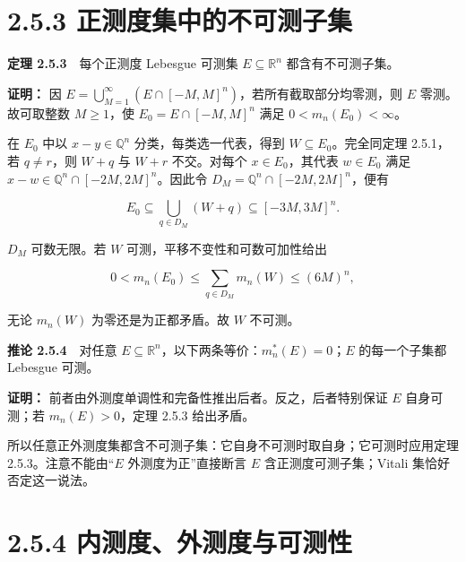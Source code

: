 \documentclass[11pt,a4paper]{article}
\begin{document}
\section[\S{}2.5.3
正测度集中的不可测子集]{2.5.3
正测度集中的不可测子集}\label{ux6b63ux6d4bux5ea6ux96c6ux4e2dux7684ux4e0dux53efux6d4bux5b50ux96c6}

\textbf{定理 2.5.3}　每个正测度 Lebesgue 可测集
\(E\subseteq\mathbb R^n\) 都含有不可测子集。

\textbf{证明：} 因
\(E=\bigcup_{M=1}^\infty(E\cap[-M,M]^n)\)，若所有截取部分均零测，则
\(E\) 零测。故可取整数 \(M\ge1\)，使 \(E_0=E\cap[-M,M]^n\) 满足
\(0<m_n(E_0)<\infty\)。

在 \(E_0\) 中以 \(x-y\in\mathbb Q^n\) 分类，每类选一代表，得到
\(W\subseteq E_0\)。完全同定理 2.5.1，若 \(q\ne r\)，则 \(W+q\) 与
\(W+r\) 不交。对每个 \(x\in E_0\)，其代表 \(w\in E_0\) 满足
\(x-w\in\mathbb Q^n\cap[-2M,2M]^n\)。因此令
\(D_M=\mathbb Q^n\cap[-2M,2M]^n\)，便有

\begin{equation*}
E_0\subseteq\bigcup_{q\in D_M}(W+q)\subseteq[-3M,3M]^n.
\tag{2.5.5}
\end{equation*}

\(D_M\) 可数无限。若 \(W\) 可测，平移不变性和可数可加性给出

\begin{equation*}
0<m_n(E_0)\le\sum_{q\in D_M}m_n(W)\le(6M)^n,
\end{equation*}

无论 \(m_n(W)\) 为零还是为正都矛盾。故 \(W\) 不可测。

\textbf{推论 2.5.4}　对任意
\(E\subseteq\mathbb R^n\)，以下两条等价：\(m_n^*(E)=0\)；\(E\)
的每一个子集都 Lebesgue 可测。

\textbf{证明：} 前者由外测度单调性和完备性推出后者。反之，后者特别保证
\(E\) 自身可测；若 \(m_n(E)>0\)，定理 2.5.3 给出矛盾。

所以任意正外测度集都含不可测子集：它自身不可测时取自身；它可测时应用定理
2.5.3。注意不能由``\(E\) 外测度为正''直接断言 \(E\)
含正测度可测子集；Vitali 集恰好否定这一说法。

\section[\S{}2.5.4
内测度、外测度与可测性]{2.5.4
内测度、外测度与可测性}\label{ux5185ux6d4bux5ea6ux5916ux6d4bux5ea6ux4e0eux53efux6d4bux6027}
\end{document}
